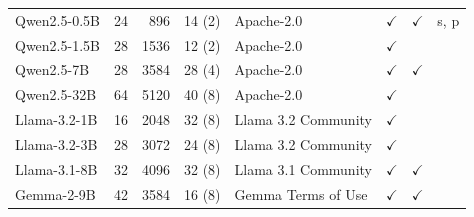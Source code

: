 \begin{table}[tbp]
\begin{tabular}{@{}lrrrlccl@{}}
    Qwen2.5-0.5B & 24 & 896 & 14 (2) & Apache-2.0 & $\checkmark$ & $\checkmark$ & s, p \\
    Qwen2.5-1.5B & 28 & 1536 & 12 (2) & Apache-2.0 & $\checkmark$ &  &  \\
    Qwen2.5-7B & 28 & 3584 & 28 (4) & Apache-2.0 & $\checkmark$ & $\checkmark$ &  \\
    Qwen2.5-32B & 64 & 5120 & 40 (8) & Apache-2.0 & $\checkmark$ &  &  \\
    Llama-3.2-1B & 16 & 2048 & 32 (8) & Llama 3.2 Community & $\checkmark$ &  &  \\
    Llama-3.2-3B & 28 & 3072 & 24 (8) & Llama 3.2 Community & $\checkmark$ &  &  \\
    Llama-3.1-8B & 32 & 4096 & 32 (8) & Llama 3.1 Community & $\checkmark$ & $\checkmark$ &  \\
    Gemma-2-9B & 42 & 3584 & 16 (8) & Gemma Terms of Use & $\checkmark$ & $\checkmark$ &  \\
    \bottomrule
  \end{tabular}
\end{table}
